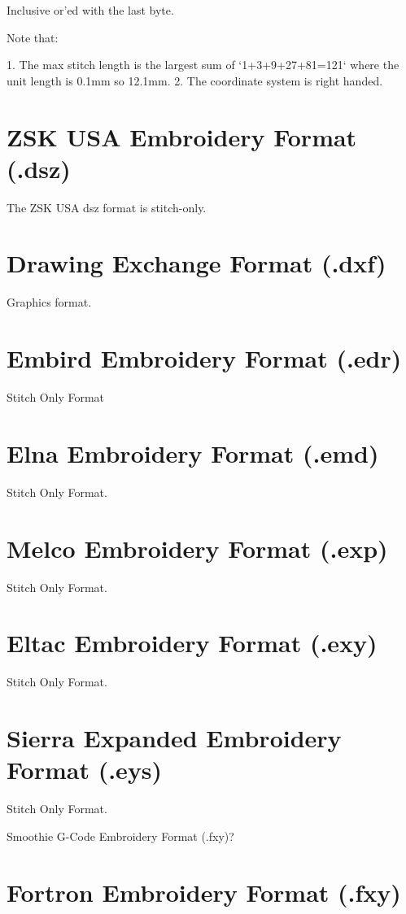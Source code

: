 \documentclass{report}
\begin{document}
Inclusive or'ed with the last byte.

Note that:

  1. The max stitch length is the largest sum of `1+3+9+27+81=121` where the unit length is 0.1mm so 12.1mm.
  2. The coordinate system is right handed.

\section{ZSK USA Embroidery Format (.dsz)}

The ZSK USA dsz format is stitch-only.

\section{Drawing Exchange Format (.dxf)}

Graphics format.

\section{Embird Embroidery Format (.edr)}

Stitch Only Format

\section{Elna Embroidery Format (.emd)}

Stitch Only Format.

\section{Melco Embroidery Format (.exp)}

Stitch Only Format.

\section{Eltac Embroidery Format (.exy)}

Stitch Only Format.

\section{Sierra Expanded Embroidery Format (.eys)}

Stitch Only Format.

Smoothie G-Code Embroidery Format (.fxy)?

\section{Fortron Embroidery Format (.fxy)}
\end{document}
